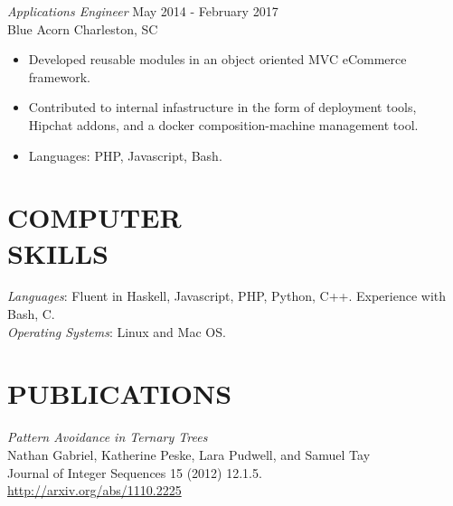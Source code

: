 \documentclass[margin]{res}
\begin{document}
\begin{resume}
  {\sl Applications Engineer} \hfill May 2014 - February 2017 \\
  Blue Acorn \hfill Charleston, SC
  \begin{itemize}  \itemsep -2pt %
    \item Developed reusable modules in an object oriented MVC eCommerce framework.
    \item Contributed to internal infastructure in the form of deployment tools,
      Hipchat addons, and a docker composition-machine management tool.
    \item Languages: PHP, Javascript, Bash.
  \end{itemize}

\section{COMPUTER \\ SKILLS}
  {\sl Languages}: Fluent in Haskell, Javascript, PHP, Python, C++. Experience with Bash, C. \\
  {\sl Operating Systems}: Linux and Mac OS.

\section{PUBLICATIONS}
  {\sl Pattern Avoidance in Ternary Trees} \\
  Nathan Gabriel, Katherine Peske, Lara Pudwell, and Samuel Tay \\
  Journal of Integer Sequences 15 (2012) 12.1.5. \\
  \url{http://arxiv.org/abs/1110.2225}

\end{resume}
\end{document}
